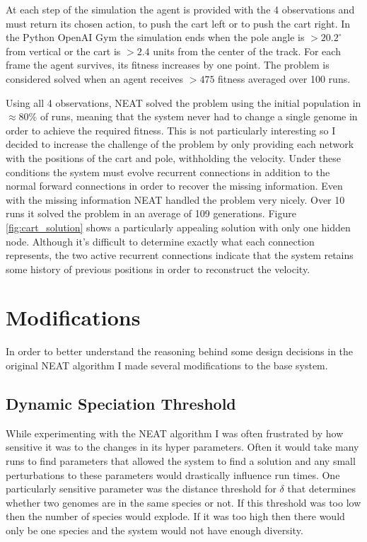 \documentclass[twocolumn,letterpaper]{article}
\begin{document}
At each step 
of the simulation the agent is provided with the 4 observations and must return its chosen action, to push
the cart left or to push the cart right. In the Python OpenAI Gym \cite{gym} the simulation ends when the
pole angle is $> 20.2^{\circ}$ from vertical or the cart is $> 2.4$ units from the center of the track. For each
frame the agent survives, its fitness increases by one point. The problem is considered solved when an agent
receives $> 475$ fitness averaged over 100 runs. 

Using all 4 observations, NEAT solved the problem using the initial population in $\approx80\%$ of runs, meaning
that the system never had to change a single genome in order to achieve the required fitness. This is not
particularly interesting so I decided to increase the challenge of the problem by only providing each network
with the positions of the cart and pole, withholding the velocity. Under these conditions the system must
evolve recurrent connections in addition to the normal forward connections in order to recover the missing
information. Even with the missing information NEAT handled the problem very nicely. Over 10 runs it solved
the problem in an average of 109 generations. Figure \ref{fig:cart_solution} shows a particularly
appealing solution with only one hidden node. Although it's difficult to determine exactly what each 
connection represents, the two active recurrent connections indicate that the system retains some history
of previous positions in order to reconstruct the velocity.  

\section{Modifications} \label{sec:mods}
In order to better understand the reasoning behind some design decisions in the original NEAT algorithm I made
several modifications to the base system.

\subsection{Dynamic Speciation Threshold} \label{sec:speciation}
While experimenting with the NEAT algorithm I was often frustrated by how sensitive it was to the changes
in its hyper parameters. Often it would take many runs to find parameters that allowed the system to find a
solution and any small perturbations to these parameters would drastically influence run times. One 
particularly sensitive parameter was the distance threshold for $\delta$ that determines whether two genomes
are in the same species or not. If this threshold was too low then the number of species would explode. If
it was too high then there would only be one species and the system would not have enough diversity.
\end{document}
